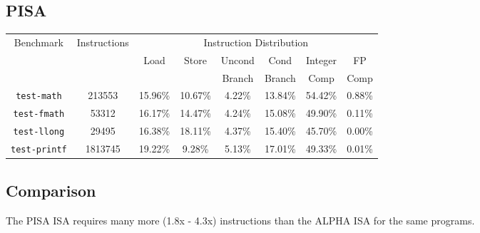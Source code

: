 \documentclass[11pt]{article}
\begin{document}
\subsection{PISA}
\label{sec:orgde703a7}
\begin{table}[htb]
\begin{center}
\begin{tabular}{|c|c|c|c|c|c|c|c|}
  \hline
  \multirow{3}{*}{Benchmark} & \multirow{3}{*}{Instructions} & \multicolumn{6}{c|}{Instruction Distribution} \\ \cline{3-8}
  & & \multirow{2}{*}{Load} & \multirow{2}{*}{Store} & Uncond & Cond   & Integer  & FP\\
  & &                       &                        & Branch & Branch & Comp     & Comp \\
  \hline
  \texttt{test-math} & 213553 & 15.96\% & 10.67\% & 4.22\% & 13.84\% & 54.42\% & 0.88\% \\
  \texttt{test-fmath} & 53312 & 16.17\% & 14.47\% & 4.24\% & 15.08\% & 49.90\% & 0.11\% \\
  \texttt{test-llong} & 29495 & 16.38\% & 18.11\% & 4.37\% & 15.40\% & 45.70\% & 0.00\% \\
  \texttt{test-printf} & 1813745 & 19.22\% & 9.28\% & 5.13\% & 17.01\% & 49.33\% & 0.01\% \\
  \hline
\end{tabular}
\end{center}
\end{table}

\subsection{Comparison}
\label{sec:org86f8c5d}
The PISA ISA requires many more (1.8x - 4.3x) instructions than the \mbox{ALPHA} ISA for the same programs.
\end{document}
